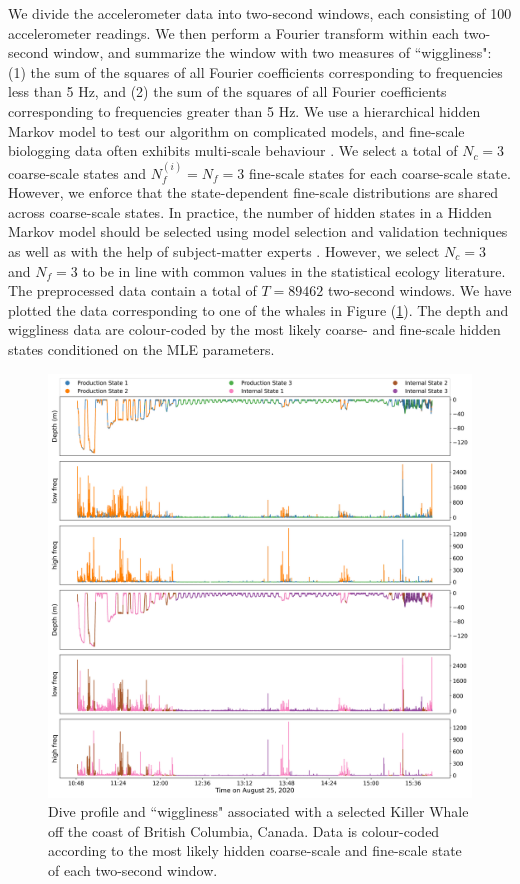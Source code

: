 We divide the accelerometer data into two-second windows, each consisting of 100 accelerometer readings. We then perform a Fourier transform within each two-second window, and summarize the window with two measures of ``wiggliness":
(1) the sum of the squares of all Fourier coefficients corresponding to frequencies less than 5 Hz, and (2) the sum of the squares of all Fourier coefficients corresponding to frequencies greater than 5 Hz. We use a hierarchical hidden Markov model \citep{Barajas:2017} to test our algorithm on complicated models, and fine-scale biologging data often exhibits multi-scale behaviour \citep{Sidrow:2021}. We select a total of $N_c = 3$ coarse-scale states and $N_f^{(i)} = N_f = 3$ fine-scale states for each coarse-scale state. However, we enforce that the state-dependent fine-scale distributions are shared across coarse-scale states. In practice, the number of hidden states in a Hidden Markov model should be selected using model selection and validation techniques as well as with the help of subject-matter experts \citep{Pohle:2017}. However, we select $N_c = 3$ and $N_f = 3$ to be in line with common values in the statistical ecology literature. The preprocessed data contain a total of $T=89462$ two-second windows. We have plotted the data corresponding to one of the whales in Figure (\ref{fig:data}). The depth and wiggliness data are colour-coded by the most likely coarse- and fine-scale hidden states conditioned on the MLE parameters.
%
\begin{figure}
    \centering
    \includegraphics[width=6.5in]{plt/decoded_dives_kw_I145_K_3_3_nWhales_8.png}
    \caption{Dive profile and ``wiggliness" associated with a selected Killer Whale off the coast of British Columbia, Canada. Data is colour-coded according to the most likely hidden coarse-scale and fine-scale state of each two-second window.}
    \label{fig:data}
\end{figure}
